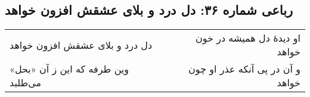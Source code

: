 \begin{center}
\section*{رباعی شماره ۳۶: دل درد و بلای عشقش افزون خواهد}
\label{sec:036}
\begin{longtable}{l p{0.5cm} r}
دل درد و بلای عشقش افزون خواهد
&&
او دیدهٔ دل همیشه در خون خواهد
\\
وین طرفه که این ز آن «بحل» می‌طلبد
&&
و آن در پی آنکه عذر او چون خواهد
\\
\end{longtable}
\end{center}
